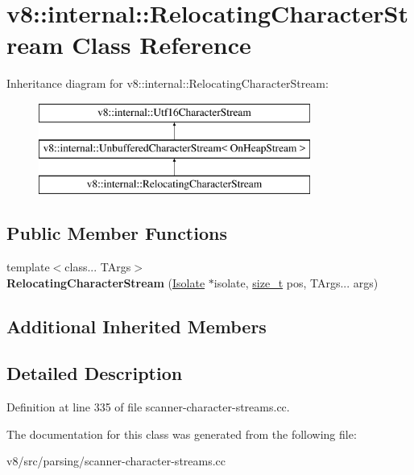 \hypertarget{classv8_1_1internal_1_1RelocatingCharacterStream}{}\section{v8\+:\+:internal\+:\+:Relocating\+Character\+Stream Class Reference}
\label{classv8_1_1internal_1_1RelocatingCharacterStream}
Inheritance diagram for v8\+:\+:internal\+:\+:Relocating\+Character\+Stream\+:\begin{figure}[H]
\begin{center}
\leavevmode
\includegraphics[height=3.000000cm]{classv8_1_1internal_1_1RelocatingCharacterStream}
\end{center}
\end{figure}
\subsection*{Public Member Functions}
\begin{DoxyCompactItemize}
\item 
\mbox{\label{classv8_1_1internal_1_1RelocatingCharacterStream_a1e7f4379fb8c91272f3eed9745d72d86}} 
{\footnotesize template$<$class... T\+Args$>$ }\\{\bfseries Relocating\+Character\+Stream} (\mbox{\hyperlink{classv8_1_1internal_1_1Isolate}{Isolate}} $\ast$isolate, \mbox{\hyperlink{classsize__t}{size\+\_\+t}} pos, T\+Args... args)
\end{DoxyCompactItemize}
\subsection*{Additional Inherited Members}


\subsection{Detailed Description}


Definition at line 335 of file scanner-\/character-\/streams.\+cc.



The documentation for this class was generated from the following file\+:\begin{DoxyCompactItemize}
\item 
v8/src/parsing/scanner-\/character-\/streams.\+cc\end{DoxyCompactItemize}
